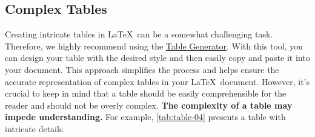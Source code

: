 {	\subsection{Complex Tables}
	Creating intricate tables in \LaTeX\ can be a somewhat challenging task. Therefore, we highly recommend using the \href{https://www.tablesgenerator.com/}{Table Generator}. With this tool, you can design your table with the desired style and then easily copy and paste it into your document. This approach simplifies the process and helps ensure the accurate representation of complex tables in your \LaTeX\ document. However, it's crucial to keep in mind that a table should be easily comprehensible for the reader and should not be overly complex. \textbf{The complexity of a table may impede understanding.} For example, \autoref{tab:table-04} presents a table with intricate details.

}

